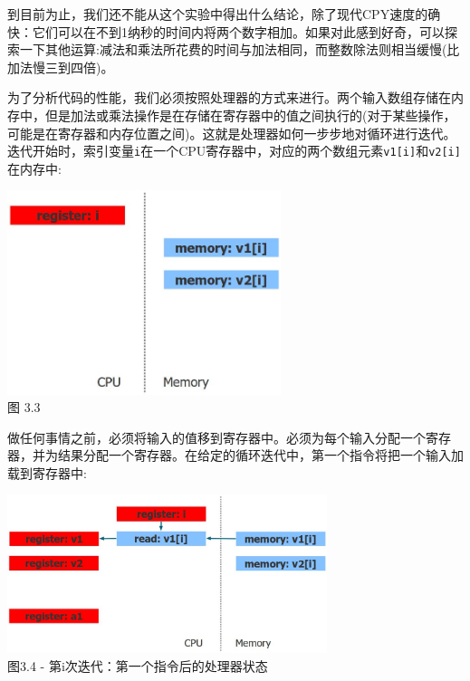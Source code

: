 到目前为止，我们还不能从这个实验中得出什么结论，除了现代CPY速度的确快：它们可以在不到1纳秒的时间内将两个数字相加。如果对此感到好奇，可以探索一下其他运算:减法和乘法所花费的时间与加法相同，而整数除法则相当缓慢(比加法慢三到四倍)。

为了分析代码的性能，我们必须按照处理器的方式来进行。两个输入数组存储在内存中，但是加法或乘法操作是在存储在寄存器中的值之间执行的(对于某些操作，可能是在寄存器和内存位置之间)。这就是处理器如何一步步地对循环进行迭代。迭代开始时，索引变量\texttt{i}在一个CPU寄存器中，对应的两个数组元素\texttt{v1[i]}和\texttt{v2[i]}在内存中:

\begin{center}
\includegraphics[width=0.6\textwidth]{content/1/chapter3/images/3.jpg}\\
图 3.3
\end{center}

做任何事情之前，必须将输入的值移到寄存器中。必须为每个输入分配一个寄存器，并为结果分配一个寄存器。在给定的循环迭代中，第一个指令将把一个输入加载到寄存器中:

\begin{center}
\includegraphics[width=0.7\textwidth]{content/1/chapter3/images/4.jpg}\\
图3.4 - 第i次迭代：第一个指令后的处理器状态
\end{center}

